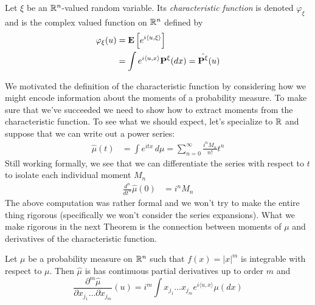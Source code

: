 \begin{defn}Let $\xi$ be an $\mathbb{R}^n$-valued random variable. Its
  \emph{characteristic function} is denoted $\varphi_\xi$ and is the complex
  valued function on
  $\mathbb{R}^n$ defined by 
\begin{align*}
\varphi_\xi(u) &= \textbf{E}\left[e^{i\langle u,\xi \rangle}\right] \\
&= \int e^{i\langle u,x \rangle} \textbf{P}^{\xi}(dx) =
\hat{\textbf{P}^{\xi}}(u) 
\end{align*}
\end{defn}

We motivated the definition of the characteristic function by
considering how we might encode information about the moments of a
probability measure.  To make sure that we've succeeded we need to
show how to extract moments from the characteristic function.  To see
what we should expect, let's specialize to $\mathbb{R}$ and suppose that
we can write out a power series:
\begin{align*}
\hat{\mu}(t) &= \int e^{itx} \, d\mu = \sum_{n=0}^\infty \frac{i^n
  M_n}{n!} t^n
\end{align*}
Still working formally, we see that we can differentiate the series with respect
to $t$ to isolate each individual moment $M_n$
\begin{align*}
\frac{d^n}{dt^n} \hat{\mu}(0) &= i^n M_n
\end{align*}
The above computation was rather formal and we won't try to make the
entire thing rigorous (specifically we won't consider the series
expansions).  What we make rigorous in the next Theorem is the connection between
moments of $\mu$ and derivatives of the characteristic function.
\begin{thm}\label{MomentsAndDerivatives} Let $\mu$ be a probability measure on $\mathbb{R}^n$ such that
  $f(x) = \left| x \right| ^ m$ is integrable with respect to $\mu$.
  Then $\hat{\mu}$ is has continuous partial derivatives up to order
  $m$ and 
\begin{equation*}
 \frac{\partial^m \hat{\mu}} {\partial x_{j_1} \ldots \partial x_{j_m}}(u) =
 i^m \int x_{j_1} \ldots x_{j_m}e^{i\langle u,x \rangle} \mu(dx)
\end{equation*}
\end{thm}

